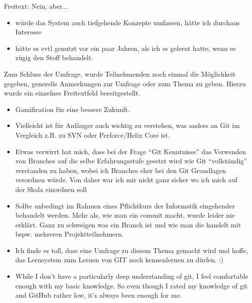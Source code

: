 \documentclass[
	ngerman,
	BCOR=8mm,
	headings=normal,
	parskip=half,
	headsepline,
	automark,
	listof=totoc,
	bibliography=totoc,
]{scrreprt}
\begin{document}
Freitext: Nein, aber...
\begin{itemize}
    \setlength{\itemsep}{-1pt} 
    \item würde das System auch tiefgehende Konzepte umfassen, hätte ich durchaus Interesse
    \item hätte es evtl genutzt vor ein paar Jahren, als ich es gelernt hatte, wenn es zügig den Stoff behandelt.
\end{itemize}

\parbox{\linewidth}{
    Zum Schluss der Umfrage, wurde Teilnehmenden noch einmal die Möglichkeit gegeben, generelle Anmerkungen zur Umfrage oder zum Thema zu geben. Hierzu wurde ein einzelnes Freitextfeld bereitgestellt.

    \begin{itemize}
        \setlength{\itemsep}{-1pt} 
        \item Gamification für eine bessere Zukunft.
        \item Vielleicht ist für Anfänger auch wichtig zu verstehen, was anders an Git im Vergleich z.B. zu SVN oder Perforce/Helix Core ist.
        \item Etwas verwirrt hat mich, dass bei der Frage ``Git Kenntnisse'' das Verwenden von Branches auf die selbe Erfahrungsstufe gesetzt wird wie Git ``vollständig'' verstanden zu haben, wobei ich Branches eher bei den Git Grundlagen verordnen würde. Von daher war ich mir nicht ganz sicher wo ich mich auf der Skala einordnen soll
        \item Sollte unbedingt im Rahmen eines Pflichtkurs der Informatik eingehender behandelt werden. Mehr als, wie man ein commit macht, wurde leider nie erklärt. Ganz zu schweigen was ein Branch ist und wie man die handelt mit bspw. mehreren Projektteilnehmern.
        \item Ich finde es toll, dass eine Umfrage zu diesem Thema gemacht wird und hoffe, das Lernsystem zum Lernen von GIT noch kennenlernen zu dürfen. :)
        \item While I don't have a particularly deep understanding of git, I feel comfortable enough with my basic knowledge. So even though I rated my knowledge of git and GitHub rather low, it's always been enough for me.
    \end{itemize}
}

%

%
%
\end{document}
